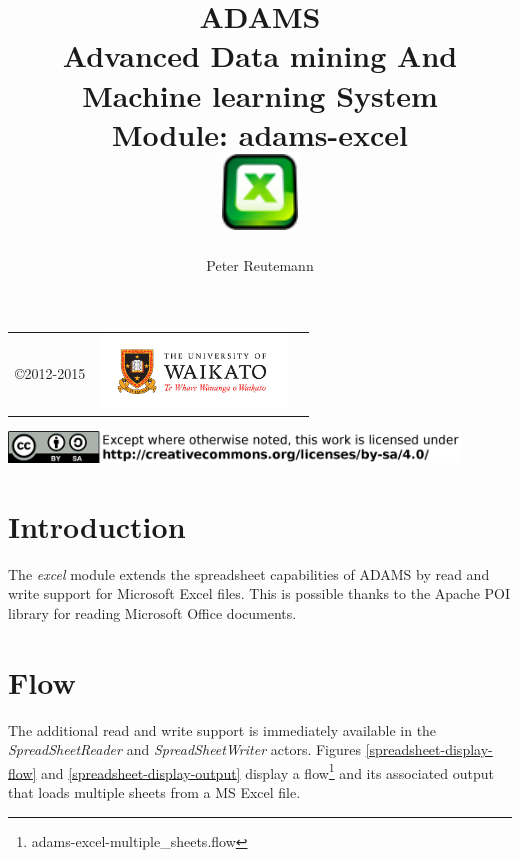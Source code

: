 \documentclass[a4paper]{book}
\title{
  \textbf{ADAMS} \\
  {\Large \textbf{A}dvanced \textbf{D}ata mining \textbf{A}nd \textbf{M}achine
  learning \textbf{S}ystem} \\
  {\Large Module: adams-excel} \\
  \vspace{1cm}
  \includegraphics[width=2cm]{images/excel-module.png} \\
}
\author{
  Peter Reutemann
}
\begin{document}
\begin{titlepage}
\maketitle

\thispagestyle{empty}
\center
\begin{table}[b]
	\begin{tabular}{c l l}
		\parbox[c][2cm]{2cm}{\copyright 2012-2015} &
		\parbox[c][2cm]{5cm}{\includegraphics[width=5cm]{images/coat_of_arms.pdf}} \\
	\end{tabular}
	\includegraphics[width=12cm]{images/cc.png} \\
\end{table}

\end{titlepage}

\tableofcontents
\listoffigures

\chapter{Introduction}
The \textit{excel} module extends the spreadsheet capabilities of ADAMS by read
and write support for Microsoft Excel files. This is possible thanks to the 
Apache POI library \cite{poi} for reading Microsoft Office documents.

\chapter{Flow}
The additional read and write support is immediately available in the 
\textit{SpreadSheetReader} and \textit{SpreadSheetWriter} actors.
Figures \ref{spreadsheet-display-flow} and \ref{spreadsheet-display-output}
display a flow\footnote{adams-excel-multiple\_sheets.flow} and its associated
output that loads multiple sheets from a MS Excel file.
\end{document}
